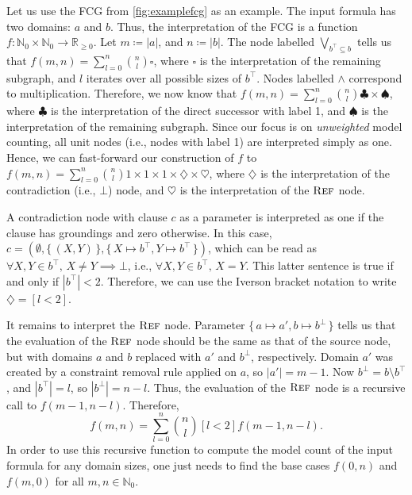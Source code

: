 
\begin{example}\label{example:evaluation}
  Let us use the FCG from \cref{fig:examplefcg} as an example. The input formula
  has two domains: $a$ and $b$. Thus, the interpretation of the FCG is a
  function
  $f\colon \mathbb{N}_{0} \times \mathbb{N}_{0} \to \mathbb{R}_{\ge 0}$. Let
  $m \coloneqq |a|$, and $n \coloneqq |b|$. The node labelled
  $\bigvee_{b^{\top} \subseteq b}$ tells us that
  $f(m, n) = \sum_{l = 0}^{n} \binom{n}{l} \square$, where $\square$ is the
  interpretation of the remaining subgraph, and $l$ iterates over all possible
  sizes of $b^{\top}$. Nodes labelled $\land$ correspond to multiplication.
  Therefore, we now know that
  $f(m, n) = \sum_{l = 0}^{n} \binom{n}{l} \clubsuit \times \spadesuit$, where
  $\clubsuit$ is the interpretation of the direct successor with label 1, and
  $\spadesuit$ is the interpretation of the remaining subgraph. Since our focus
  is on \emph{unweighted} model counting, all unit nodes (i.e., nodes with label
  1) are interpreted simply as one. Hence, we can fast-forward our construction
  of $f$ to
  $f(m, n) = \sum_{l = 0}^{n} \binom{n}{l} 1 \times 1 \times 1 \times \diamondsuit \times \heartsuit$,
  where $\diamondsuit$ is the interpretation of the contradiction (i.e., $\bot$)
  node, and $\heartsuit$ is the interpretation of the $\operatorname{\textsc{Ref}}$ node.

  A contradiction node with clause $c$ as a parameter is interpreted as one if
  the clause has groundings and zero otherwise. In this case,
  $c = (\emptyset, \{\, (X, Y) \,\}, \{\, X \mapsto b^\top, Y \mapsto b^\top \,\})$,
  which can be read as $\forall X, Y \in b^{\top}\text{,
  }X \ne Y \implies \bot$, i.e., $\forall X, Y \in b^{\top}\text{, }X = Y$. This
  latter sentence is true if and only if $|b^{\top}| < 2$. Therefore, we
  can use the Iverson bracket notation to write $\diamondsuit = [l < 2]$.

  It remains to interpret the $\operatorname{\textsc{Ref}}$ node. Parameter
  $\{\, a \mapsto a', b \mapsto b^\bot \,\}$ tells us that the evaluation of the
  $\operatorname{\textsc{Ref}}$ node should be the same as that of the source node, but with domains
  $a$ and $b$ replaced with $a'$ and $b^{\bot}$, respectively. Domain $a'$ was
  created by a constraint removal rule applied on $a$, so $|a'| = m - 1$. Now
  $b^{\bot} = b \setminus b^{\top}$, and $|b^{\top}| = l$, so
  $|b^{\bot}| = n - l$. Thus, the evaluation of the $\operatorname{\textsc{Ref}}$ node is a recursive
  call to $f(m - 1, n - l)$. Therefore,
  \begin{equation}\label{eq:solution}
    f(m, n) = \sum_{l = 0}^{n} \binom{n}{l} [l < 2] f(m-1, n-l).
  \end{equation}
  In order to use this recursive function to compute the model count of the
  input formula for any domain sizes, one just needs to find the base cases
  $f(0, n)$ and $f(m, 0)$ for all $m, n \in \mathbb{N}_{0}$.
\end{example}

